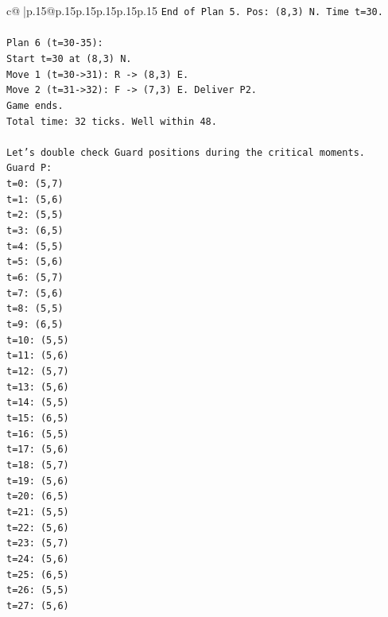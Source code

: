 \documentclass{article}
\begin{document}
{\begin{supertabular}{c@{$\;$}|p{.15\linewidth}@{}p{.15\linewidth}p{.15\linewidth}p{.15\linewidth}p{.15\linewidth}p{.15\linewidth}}
{{{\texttt{End of Plan 5. Pos: (8,3) N. Time t=30.} \\
\\ 
\texttt{Plan 6 (t=30{-}35):} \\
\texttt{Start t=30 at (8,3) N.} \\
\texttt{Move 1 (t=30{-}>31): R {-}> (8,3) E.} \\
\texttt{Move 2 (t=31{-}>32): F {-}> (7,3) E. Deliver P2.} \\
\texttt{Game ends.} \\
\texttt{Total time: 32 ticks. Well within 48.} \\
\\ 
\texttt{Let's double check Guard positions during the critical moments.} \\
\texttt{Guard P:} \\
\texttt{t=0: (5,7)} \\
\texttt{t=1: (5,6)} \\
\texttt{t=2: (5,5)} \\
\texttt{t=3: (6,5)} \\
\texttt{t=4: (5,5)} \\
\texttt{t=5: (5,6)} \\
\texttt{t=6: (5,7)} \\
\texttt{t=7: (5,6)} \\
\texttt{t=8: (5,5)} \\
\texttt{t=9: (6,5)} \\
\texttt{t=10: (5,5)} \\
\texttt{t=11: (5,6)} \\
\texttt{t=12: (5,7)} \\
\texttt{t=13: (5,6)} \\
\texttt{t=14: (5,5)} \\
\texttt{t=15: (6,5)} \\
\texttt{t=16: (5,5)} \\
\texttt{t=17: (5,6)} \\
\texttt{t=18: (5,7)} \\
\texttt{t=19: (5,6)} \\
\texttt{t=20: (6,5)} \\
\texttt{t=21: (5,5)} \\
\texttt{t=22: (5,6)} \\
\texttt{t=23: (5,7)} \\
\texttt{t=24: (5,6)} \\
\texttt{t=25: (6,5)} \\
\texttt{t=26: (5,5)} \\
\texttt{t=27: (5,6)} \\
}}}
\end{supertabular}}
\end{document}
